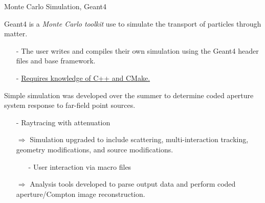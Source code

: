 \documentclass[xcolor=x11names,compress]{beamer}
\renewcommand{\(}{\begin{columns}}
\renewcommand{\)}{\end{columns}}
\newcommand{\<}[1]{\begin{column}{#1}}
\renewcommand{\>}{\end{column}}
\begin{document}
\begin{frame}{Monte Carlo Simulation, Geant4}

Geant4 \cite{Agostinelli} is a \emph{Monte Carlo toolkit} use to simulate the transport of particles through matter.
\begin{itemize}
\small
\item[-] The user writes and compiles their own simulation using the Geant4 header files and base framework.
\item[-] \underline{Requires knowledge of C++ and CMake.}
\end{itemize}

\vspace{3ex}

Simple simulation was developed over the summer to determine coded aperture system response to far-field point sources.
\begin{itemize}
\small
\item[-] Raytracing with attenuation
\end{itemize}

\vspace{3ex}

\begin{itemize}
\item[$\Rightarrow$] Simulation upgraded to include scattering, multi-interaction tracking, geometry modifications, and source modifications. 
\begin{itemize}
\small
\item[-] User interaction via macro files
\end{itemize}
\item[$\Rightarrow$] Analysis tools developed to parse output data and perform coded aperture/Compton image reconstruction.
\end{itemize}



\end{frame}
\end{document}
